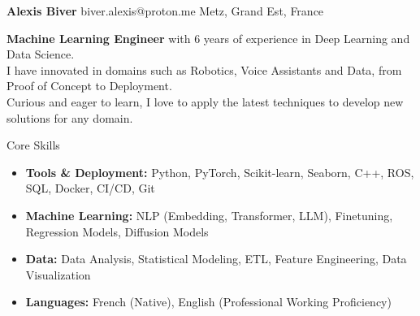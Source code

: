 \documentclass{resume} %
\begin{document}
\begin{center}
    {\Huge \textbf{Alexis Biver}} \hspace{0.3cm} biver.alexis@proton.me \hspace{2.7cm} Metz, Grand Est, France \\
\end{center}

\begin{center}
\textbf{Machine Learning Engineer} with 6 years of experience in Deep Learning and Data Science. \\
I have innovated in domains such as Robotics, Voice Assistants and Data, from Proof of Concept to Deployment. \\
Curious and eager to learn, I love to apply the latest techniques to develop new solutions for any domain.
\end{center}


\begin{rSection}{Core Skills}
\begin{itemize}
    \item \textbf{Tools \& Deployment:} Python, PyTorch, Scikit-learn, Seaborn, C++, ROS, SQL,  Docker, CI/CD, Git
    \item \textbf{Machine Learning:} NLP (Embedding, Transformer, LLM), Finetuning, Regression Models, Diffusion Models
    \item \textbf{Data:} Data Analysis, Statistical Modeling, ETL, Feature Engineering, Data Visualization
    \item \textbf{Languages:} French (Native), English (Professional Working Proficiency)
\end{itemize}
\end{rSection}
\end{document}
